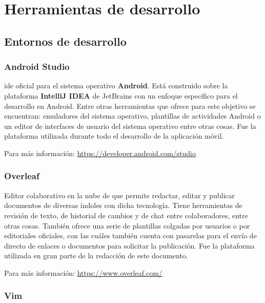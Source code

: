 \chapter{Herramientas de desarrollo}
\label{ch:herramientas_desarrollo}

\section{Entornos de desarrollo}

\subsection{Android Studio}
\label{ssec:android_studio}

\acrshort{ide} oficial para el sistema operativo \textbf{Android}. Está construido sobre la plataforma \textbf{IntelliJ IDEA} de JetBrains con un enfoque específico para el desarrollo en Android. Entre otras herramientas que ofrece para este objetivo se encuentran: emuladores del sistema operativo, plantillas de actividades Android o un editor de interfaces de usuario del sistema operativo entre otras cosas. Fue la plataforma utilizada durante todo el desarrollo de la aplicación móvil.

Para más información: \href{https://developer.android.com/studio}{https://developer.android.com/studio}

\subsection{Overleaf}
\label{ssec:overleaf}

Editor colaborativo en la nube de \textbf{} que permite redactar, editar y publicar documentos de diversas índoles con dicha tecnología. Tiene herramientas de revisión de texto, de historial de cambios y de chat entre colaboradores, entre otras cosas. También ofrece una serie de plantillas colgadas por usuarios o por editoriales oficiales, con las cuáles también cuenta con pasarelas para el envío de directo de enlaces o documentos para solicitar la publicación. Fue la plataforma utilizada en gran parte de la redacción de este documento.

Para más información: \href{https://www.overleaf.com/}{https://www.overleaf.com/}

\subsection{Vim}

